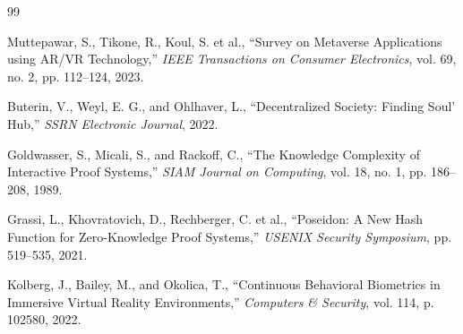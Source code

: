 \documentclass[12pt,a4paper,oneside]{report}
\begin{document}
\begin{thebibliography}{99}
    
    Muttepawar, S., Tikone, R., Koul, S. et al., ``Survey on Metaverse Applications using AR/VR Technology,'' \emph{IEEE Transactions on Consumer Electronics}, vol. 69, no. 2, pp. 112--124, 2023.
    
    Buterin, V., Weyl, E. G., and Ohlhaver, L., ``Decentralized Society: Finding Soul' Hub,'' \emph{SSRN Electronic Journal}, 2022.
    
    Goldwasser, S., Micali, S., and Rackoff, C., ``The Knowledge Complexity of Interactive Proof Systems,'' \emph{SIAM Journal on Computing}, vol. 18, no. 1, pp. 186--208, 1989.
    
    Grassi, L., Khovratovich, D., Rechberger, C. et al., ``Poseidon: A New Hash Function for Zero-Knowledge Proof Systems,'' \emph{USENIX Security Symposium}, pp. 519--535, 2021.
    
    Kolberg, J., Bailey, M., and Okolica, T., ``Continuous Behavioral Biometrics in Immersive Virtual Reality Environments,'' \emph{Computers \& Security}, vol. 114, p. 102580, 2022.
    
\end{thebibliography}
\end{document}

